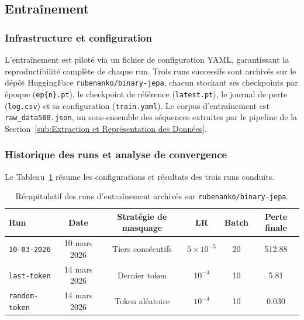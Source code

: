 \subsection{Entraînement}\label{sub:Entraînement} %



\subsubsection{Infrastructure et configuration}

L'entraînement est piloté via un fichier de configuration YAML, garantissant la
reproductibilité complète de chaque run. Trois runs successifs sont archivés sur le dépôt
HuggingFace \texttt{rubenanko/binary-jepa}, chacun stockant ses checkpoints par époque
(\texttt{ep\{n\}.pt}), le checkpoint de référence (\texttt{latest.pt}), le journal de
perte (\texttt{log.csv}) et sa configuration (\texttt{train.yaml}). Le corpus d'entraînement
est \texttt{raw\_data500.json}, un sous-ensemble des séquences extraites par le pipeline
de la Section~\ref{sub:Extraction et Représentation des Données}.

\subsubsection{Historique des runs et analyse de convergence}
\label{sub:runs}

Le Tableau~\ref{tab:runs} résume les configurations et résultats des trois runs conduits.

\begin{table}[h]
\centering
\caption{Récapitulatif des runs d'entraînement archivés sur \texttt{rubenanko/binary-jepa}.}
\label{tab:runs}
\begin{tabular}{lccccc}
\toprule
Run & Date & Stratégie de masquage & LR & Batch & Perte finale \\
\midrule
\texttt{10-03-2026} & 10 mars 2026 & Tiers consécutifs & $5 \times 10^{-5}$ & 20 & 512.88 \\
\texttt{last-token} & 14 mars 2026 & Dernier token & $10^{-4}$ & 10 & 5.81 \\
\texttt{random-token} & 14 mars 2026 & Token aléatoire & $10^{-4}$ & 10 & 0.030 \\
\bottomrule
\end{tabular}
\end{table}

